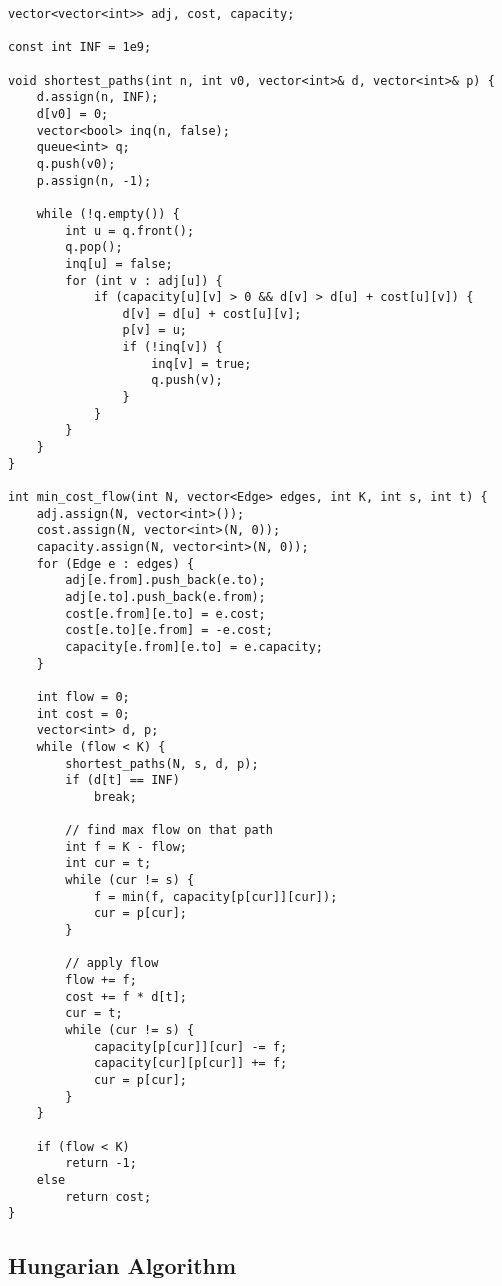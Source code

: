 \documentclass[10pt]{article}
\begin{document}
\begin{multicols*}{2}
\begin{lstlisting}[style=compactcpp]
vector<vector<int>> adj, cost, capacity;

const int INF = 1e9;

void shortest_paths(int n, int v0, vector<int>& d, vector<int>& p) {
    d.assign(n, INF);
    d[v0] = 0;
    vector<bool> inq(n, false);
    queue<int> q;
    q.push(v0);
    p.assign(n, -1);

    while (!q.empty()) {
        int u = q.front();
        q.pop();
        inq[u] = false;
        for (int v : adj[u]) {
            if (capacity[u][v] > 0 && d[v] > d[u] + cost[u][v]) {
                d[v] = d[u] + cost[u][v];
                p[v] = u;
                if (!inq[v]) {
                    inq[v] = true;
                    q.push(v);
                }
            }
        }
    }
}

int min_cost_flow(int N, vector<Edge> edges, int K, int s, int t) {
    adj.assign(N, vector<int>());
    cost.assign(N, vector<int>(N, 0));
    capacity.assign(N, vector<int>(N, 0));
    for (Edge e : edges) {
        adj[e.from].push_back(e.to);
        adj[e.to].push_back(e.from);
        cost[e.from][e.to] = e.cost;
        cost[e.to][e.from] = -e.cost;
        capacity[e.from][e.to] = e.capacity;
    }

    int flow = 0;
    int cost = 0;
    vector<int> d, p;
    while (flow < K) {
        shortest_paths(N, s, d, p);
        if (d[t] == INF)
            break;

        // find max flow on that path
        int f = K - flow;
        int cur = t;
        while (cur != s) {
            f = min(f, capacity[p[cur]][cur]);
            cur = p[cur];
        }

        // apply flow
        flow += f;
        cost += f * d[t];
        cur = t;
        while (cur != s) {
            capacity[p[cur]][cur] -= f;
            capacity[cur][p[cur]] += f;
            cur = p[cur];
        }
    }

    if (flow < K)
        return -1;
    else
        return cost;
}
\end{lstlisting}

\subsection{Hungarian Algorithm}


\end{multicols*}
\end{document}
